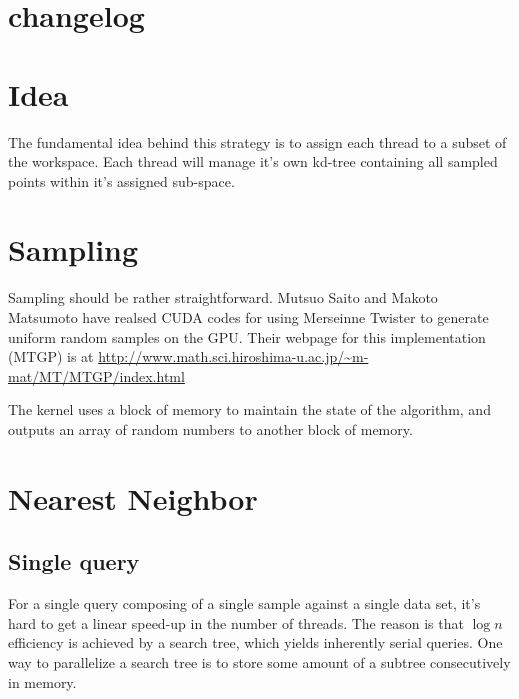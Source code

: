 
\maketitle

\section{changelog}



\section{Idea}

The fundamental idea behind this strategy is to assign each thread to a subset of the workspace. Each thread will manage it's own kd-tree containing all sampled points within it's assigned sub-space. 

\begin{figure}[H]
\begin{centering}
    \texttt{[image: \\figfile\{fig/thread\_kdtree]}}
    \caption{Division Strategy}
\end{centering}
\end{figure}

\section{Sampling}

Sampling should be rather straightforward. Mutsuo Saito and Makoto Matsumoto have realsed CUDA codes for using Merseinne Twister to generate uniform random samples on the GPU. Their webpage for this implementation (MTGP) is at \url{http://www.math.sci.hiroshima-u.ac.jp/~m-mat/MT/MTGP/index.html}

The kernel uses a block of memory to maintain the state of the algorithm, and outputs an array of random numbers to another block of memory. 

\section{Nearest Neighbor}


\subsection{Single query}
For a single query composing of a single sample against a single data set, it's hard to get a linear speed-up in the number of threads. The reason is that $\log n$ efficiency is achieved by a search tree, which yields inherently serial queries. One way to parallelize a search tree is to store some amount of a subtree consecutively in memory. 

